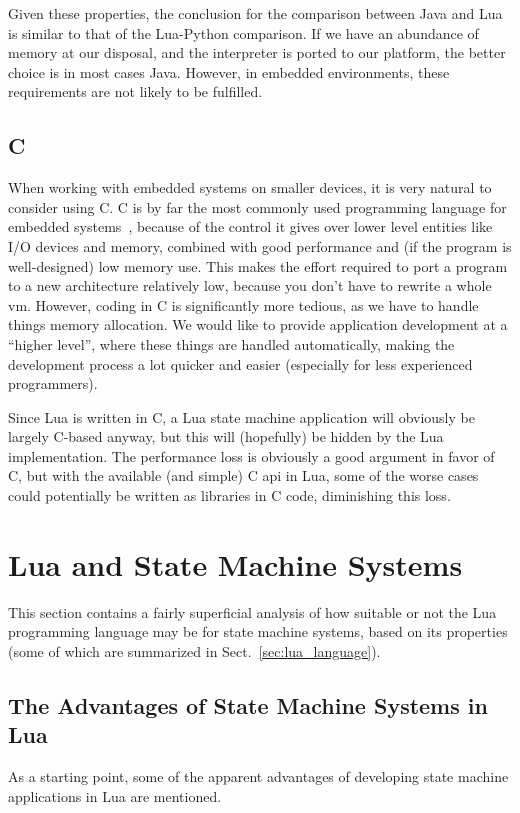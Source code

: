 \noindent
Given these properties, the conclusion for the comparison between Java and Lua is similar to that of the Lua-Python comparison. If we have an abundance of memory at our disposal, and the interpreter is ported to our platform, the better choice is in most cases Java. However, in embedded environments, these requirements are not likely to be fulfilled.

\subsection{C}
\label{sec:lua_vs_c}
When working with embedded systems on smaller devices, it is very natural to consider using C. C is by far the most commonly used programming language for embedded systems~\cite{phd:dunkels}, because of the control it gives over lower level entities like I/O devices and memory, combined with good performance and (if the program is well-designed) low memory use. This makes the effort required to port a program to a new architecture relatively low, because you don't have to rewrite a whole \gls{vm}. However, coding in C is significantly more tedious, as we have to handle things memory allocation. We would like to provide application development at a ``higher level'', where these things are handled automatically, making the development process a lot quicker and easier (especially for less experienced programmers).

\noindent
Since Lua is written in C, a Lua state machine application will obviously be largely C-based anyway, but this will (hopefully) be hidden by the Lua implementation. The performance loss is obviously a good argument in favor of C, but with the available (and simple) C \gls{api} in Lua, some of the worse cases could potentially be written as libraries in C code, diminishing this loss.

\section{Lua and State Machine Systems}
\label{sec:lua_and_state_machines}
This section contains a fairly superficial analysis of how suitable or not the Lua programming language may be for state machine systems, based on its properties (some of which are summarized in Sect.~\ref{sec:lua_language}).

\subsection{The Advantages of State Machine Systems in Lua}
\label{sec:lua_advantages}
As a starting point, some of the apparent advantages of developing state machine applications in Lua are mentioned.

